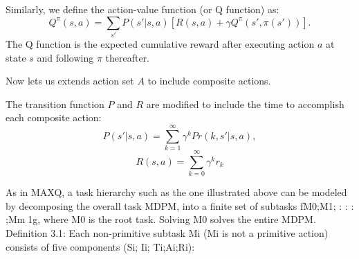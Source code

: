 \documentclass{article} %
\begin{document}
Similarly, we define the action-value function (or Q function) as:
\begin{equation}
    Q^{\pi}(s, a) = \sum_{s'}P(s'|s, a)[R(s, a) + \gamma Q^{\pi}(s', \pi(s'))].
    \label{eq:Q}
\end{equation}
The Q function is the expected cumulative reward after executing action $a$ at state $s$ and following
$\pi$ thereafter.

Now lets us extends action set $A$ to include composite actions.

The transition function $P$ and $R$ are modified to include the time to accomplish each composite action:
\begin{equation}
    P(s'|s, a) = \sum^{\infty}_{k=1} \gamma^k Pr(k, s'|s, a),
    \label{eq:multiProb}
\end{equation}
\begin{equation}
    R(s, a) = \sum^{\infty}_{k=0} \gamma^k r_k
\end{equation}


As in MAXQ, a task hierarchy such as the one illustrated above can be modeled by
decomposing the overall task MDPM, into a finite set of subtasks fM0;M1; : : : ;Mm􀀀1g,
where M0 is the root task. Solving M0 solves the entire MDPM.
Definition 3.1: Each non-primitive subtask Mi (Mi is not a primitive action) consists
of five components (Si; Ii; Ti;Ai;Ri):
\end{document}
